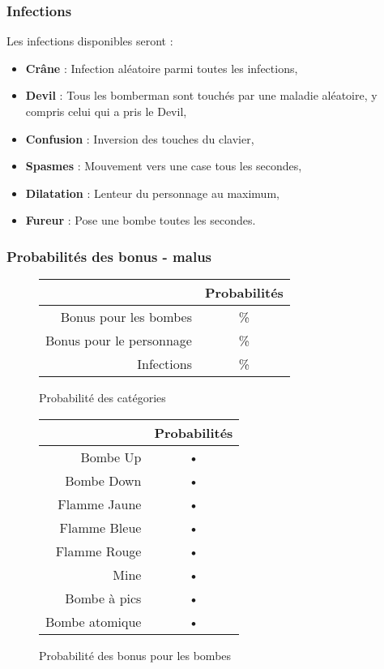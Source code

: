 \subsubsection{Infections}

Les infections disponibles seront :
\begin{itemize}
\item \textbf{Crâne} : Infection aléatoire parmi toutes les infections,
\item \textbf{Devil} : Tous les bomberman sont touchés par une maladie aléatoire, y compris celui qui a pris le Devil,
\item \textbf{Confusion} : Inversion des touches du clavier,
\item \textbf{Spasmes} : Mouvement vers une case tous les \nbSecondes secondes,
\item \textbf{Dilatation} : Lenteur du personnage au maximum,
\item \textbf{Fureur} : Pose une bombe toutes les \nbSecondes secondes.
\end{itemize}

\subsubsection{Probabilités des bonus - malus}

\begin{figure}[h]
	\begin{center}
		\begin{tabular}{|r|c|}
		\hline 
		& Probabilités \\ 
		\hline 
		Bonus pour les bombes & \% \\ 
		\hline 
		Bonus pour le personnage & \% \\ 
		\hline 
		Infections & \% \\ 
		\hline 
		\end{tabular} 
	\end{center}
	\caption{Probabilité des catégories}
\end{figure}

\begin{figure}[h]
	\begin{center}
		\begin{tabular}{|r|c|}
\hline 
& Probabilités \\ 
\hline 
Bombe Up & • \\ 
\hline 
Bombe Down & • \\ 
\hline 
Flamme Jaune & • \\ 
\hline 
Flamme Bleue & • \\ 
\hline 
Flamme Rouge & • \\ 
\hline 
Mine & • \\ 
\hline 
Bombe à pics & • \\ 
\hline 
Bombe atomique & • \\ 
\hline 
\end{tabular} 
	\end{center}
	\caption{Probabilité des bonus pour les bombes}
\end{figure}

